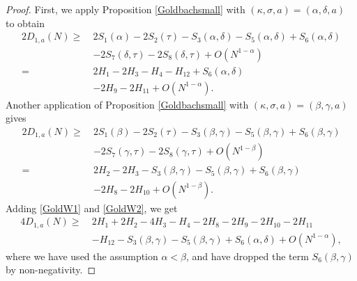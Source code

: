 \documentclass[10pt,a4paper]{amsart}
\def\ge{\geqslant}
\begin{document}
\begin{proof}
First, we apply Proposition \ref{Goldbachsmall} with $(\kappa,\sigma,a)=(\alpha,\delta,a)$ to obtain
\begin{equation}\label{GoldW1}
\begin{split}
2D_{1,a}(N)\ge\ & 2S_1(\alpha)-2S_2(\tau)-S_3(\alpha,\delta)-S_5(\alpha,\delta)+S_6(\alpha,\delta)\\
&-2S_7(\delta,\tau)-2S_8(\delta,\tau)+O(N^{1-\alpha})\\
=\ & 2H_1-2H_3-H_4-H_{12}+S_6(\alpha,\delta)\\ 
& -2H_9-2H_{11}+O(N^{1-\alpha}). 
\end{split}
\end{equation}
Another application of Proposition \ref{Goldbachsmall} with $(\kappa,\sigma,a)=(\beta,\gamma,a)$ gives 
\begin{equation}\label{GoldW2}
\begin{split}
2D_{1,a}(N)
\ge\ & 2S_1(\beta)-2S_2(\tau)-S_3(\beta,\gamma)-S_5(\beta,\gamma)+S_6(\beta,\gamma)\\
& -2S_7(\gamma,\tau)-2S_8(\gamma,\tau)+O(N^{1-\beta})\\
=\ & 2H_2-2H_3-S_3(\beta,\gamma)-S_5(\beta,\gamma)+S_6(\beta,\gamma) \\ 
& -2H_8-2H_{10}+O(N^{1-\beta}).
\end{split}
\end{equation}
Adding \eqref{GoldW1} and \eqref{GoldW2}, we get 
\begin{equation}\label{GoldW3}
\begin{split}
4D_{1,a}(N)\ge\ & 2H_1+2H_2-4H_3-H_4-2H_8-2H_9-2H_{10}-2H_{11}\\
& -H_{12} -S_3(\beta,\gamma)-S_5(\beta,\gamma)+S_6(\alpha,\delta)+O(N^{1-\alpha}),
\end{split}
\end{equation}
where we have used the assumption $\alpha<\beta$, and have dropped the term $S_6(\beta,\gamma)$ by non-negativity. 


\end{proof}
\end{document}
